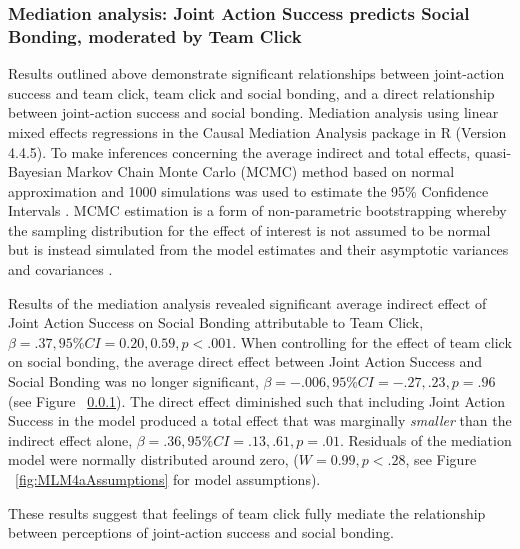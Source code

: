 \documentclass[12pt]{report}
\begin{document}
{\subsubsection{Mediation analysis: Joint Action Success predicts Social Bonding, moderated by Team Click}

Results outlined above demonstrate significant relationships between joint-action success and team click, team click and social bonding, and a direct relationship between joint-action success and social bonding. Mediation analysis using linear mixed effects regressions in the Causal Mediation Analysis package in R (Version 4.4.5).  To make inferences concerning the average indirect and total effects, quasi-Bayesian Markov Chain Monte Carlo (MCMC) method based on normal approximation and 1000 simulations was used to estimate the 95\% Confidence Intervals \citep{Tofighi2016a,Imai2010}. MCMC estimation is a form of non-parametric bootstrapping whereby the sampling distribution for the effect of interest is not assumed to be normal but is instead simulated from the model estimates and their asymptotic variances and covariances \cite{Preacher2008}.

Results of the mediation analysis revealed significant average indirect effect of Joint Action Success on Social Bonding attributable to Team Click, $\beta = .37, 95\% CI = 0.20 , 0.59, p < .001$.  When controlling for the effect of team click on social bonding, the average direct effect between Joint Action Success and Social Bonding was no longer significant, $\beta = -.006, 95\% CI = -.27 , .23, p = .96 $ (see Figure ~\ref{}). The direct effect diminished such that including Joint Action Success in the model produced a total effect that was marginally \textit{smaller} than the indirect effect alone, $\beta = .36, 95\% CI = .13 , .61, p = .01$.  Residuals of the mediation model were normally distributed around zero, ($W = 0.99, p < .28$, see Figure ~\ref{fig:MLM4aAssumptions} for model assumptions).

These results suggest that feelings of team click fully mediate the relationship between perceptions of joint-action success and social bonding.

}
\end{document}
